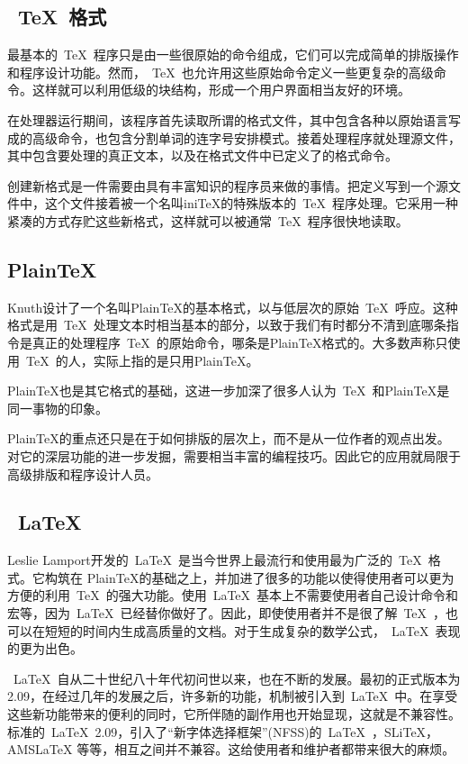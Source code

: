 \subsection{~\TeX{}~格式}
最基本的~\TeX{}~程序只是由一些很原始的命令组成，它们可以完成简单的排版操作和程序设计功能。然而，~\TeX{}~也允许用这些原始命令定义一些更复杂的高级命令。这样就可以利用低级的块结构，形成一个用户界面相当友好的环境。


在处理器运行期间，该程序首先读取所谓的格式文件，其中包含各种以原始语言写成的高级命令，也包含分割单词的连字号安排模式。接着处理程序就处理源文件，其中包含要处理的真正文本，以及在格式文件中已定义了的格式命令。


创建新格式是一件需要由具有丰富知识的程序员来做的事情。把定义写到一个源文件中，这个文件接着被一个名叫iniTeX的特殊版本的~\TeX{}~程序处理。它采用一种紧凑的方式存贮这些新格式，这样就可以被通常~\TeX{}~程序很快地读取。
\subsection{PlainTeX}
Knuth设计了一个名叫PlainTeX的基本格式，以与低层次的原始~\TeX{}~呼应。这种格式是用~\TeX{}~处理文本时相当基本的部分，以致于我们有时都分不清到底哪条指令是真正的处理程序~\TeX{}~的原始命令，哪条是PlainTeX格式的。大多数声称只使用~\TeX{}~的人，实际上指的是只用PlainTeX。


PlainTeX也是其它格式的基础，这进一步加深了很多人认为~\TeX{}~和PlainTeX是同一事物的印象。


PlainTeX的重点还只是在于如何排版的层次上，而不是从一位作者的观点出发。对它的深层功能的进一步发掘，需要相当丰富的编程技巧。因此它的应用就局限于高级排版和程序设计人员。
\subsection{~\LaTeX{}~}
Leslie Lamport开发的~\LaTeX{}~是当今世界上最流行和使用最为广泛的~\TeX{}~格式。它构筑在 PlainTeX的基础之上，并加进了很多的功能以使得使用者可以更为方便的利用~\TeX{}~的强大功能。使用~\LaTeX{}~基本上不需要使用者自己设计命令和宏等，因为~\LaTeX{}~已经替你做好了。因此，即使使用者并不是很了解~\TeX{}~，也可以在短短的时间内生成高质量的文档。对于生成复杂的数学公式，~\LaTeX{}~表现的更为出色。


~\LaTeX{}~自从二十世纪八十年代初问世以来，也在不断的发展。最初的正式版本为 2.09，在经过几年的发展之后，许多新的功能，机制被引入到~\LaTeX{}~中。在享受这些新功能带来的便利的同时，它所伴随的副作用也开始显现，这就是不兼容性。标准的~\LaTeX{}~2.09，引入了“新字体选择框架”(NFSS)的~\LaTeX{}~，SLiTeX，AMSLaTeX 等等，相互之间并不兼容。这给使用者和维护者都带来很大的麻烦。
